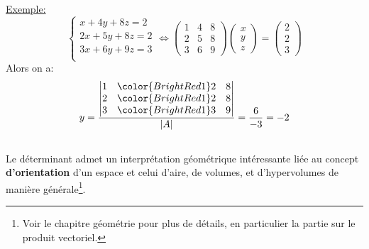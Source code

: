 \underline{Exemple:}
\[
   \begin{cases} 
      x + 4y + 8z = 2 \\
      2x + 5y + 8z = 2 \\
      3x + 6y + 9z = 3 \\
   \end{cases}   \Longleftrightarrow 
   \begin{pmatrix}
      1 & 4 & 8 \\
      2 & 5 & 8 \\
      3 & 6 & 9
   \end{pmatrix} 
   \begin{pmatrix}
      x \\
      y \\
      z  
   \end{pmatrix} =
   \begin{pmatrix}
      2 \\
      2 \\
      3  
   \end{pmatrix}
\]
Alors on a:
\[
   y = \frac{
      \begin{vmatrix}
         1 & \color{BrightRed1} 2 & 8 \\
         2 & \color{BrightRed1} 2 & 8  \\
         3 & \color{BrightRed1} 3 & 9
      \end{vmatrix}
   }{|A|} = \frac{6}{-3} = -2
\]

\subsection*{}

Le déterminant admet un interprétation géométrique intéressante liée au concept \textbf{d'orientation} d'un espace et celui d'aire, de volumes, et d'hypervolumes de manière générale\footnote[1]{Voir le chapitre géométrie pour plus de détails, en particulier la partie sur le produit vectoriel.}. \<


